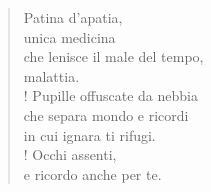 
\begin{verse}
    Patina d'apatia,\\
    unica medicina\\
    che lenisce il male del tempo,\\
    malattia.\\!
    Pupille offuscate da nebbia\\
    che separa mondo e ricordi\\
    in cui ignara ti rifugi.\\!
    Occhi assenti,\\
    e ricordo anche per te.
\end{verse}